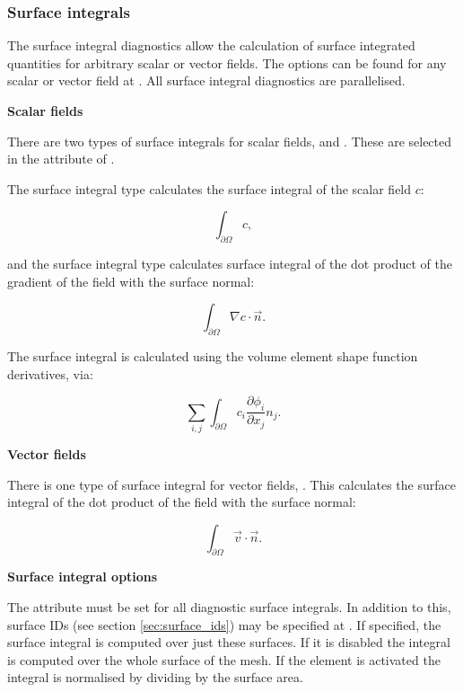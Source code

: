 \subsubsection{Surface integrals}
\label{sec:stat_surface_integral}

The surface integral diagnostics allow the calculation of surface integrated quantities
for arbitrary scalar or vector fields. The options can be found for any scalar
or vector field at . All surface integral diagnostics are parallelised.

\textbf{Scalar fields}

There are two types of surface integrals for scalar fields,  and
. These are selected in the  attribute of
.

The surface integral type  calculates the surface integral of the
scalar field $c$:

\begin{equation}
\int_{\partial \Omega} c,
\end{equation}

and the surface integral type  calculates surface integral
of the dot product of the gradient of the field with the surface normal:

\begin{equation}
\int_{\partial \Omega} \nabla c \cdot \vec{n}.
\end{equation}

The  surface integral is calculated using the volume
element shape function derivatives, via:

\begin{equation}
\sum_{i,j} \int_{\partial \Omega} {c_i \frac{\partial \phi_i}{\partial x_j} n_j}.
\end{equation}

\textbf{Vector fields}

There is one type of surface integral for vector fields, . This
calculates the surface integral of the dot product of the field with the surface
normal:

\begin{equation}
\int_{\partial \Omega} \vec{v} \cdot \vec{n}.
\end{equation}

\textbf{Surface integral options}

The  attribute must be set for all diagnostic surface integrals. In
addition to this, surface IDs (see section \ref{sec:surface_ids}) may be specified at
. If specified, the surface
integral is computed over just these surfaces. If it is disabled the integral is computed
over the whole surface of the
mesh. If the element  is activated
the integral is normalised by dividing by the surface area.

